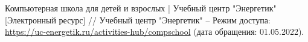 \begin{thebibliography}{00}
        Компьютерная школа для детей и взрослых | Учебный центр "Энергетик"
        [Электронный ресурс]
        //
        Учебный центр "Энергетик"
        --
        Режим доступа:
        \href{https://uc-energetik.ru/activities-hub/compschool}{https://uc-energetik.ru/activities-hub/compschool}
        (дата обращения: 01.05.2022).


\begin{comment}

    \bibitem{livejournal}
        Главное - ЖЖ
        [Электронный ресурс] //
        LiveJournal — сервис для ведения блога и развития сообщества
        --
        Режим доступа:
        \href{https://www.livejournal.com/}{https://www.livejournal.com/}
        
    \bibitem{kickstarter}
        Kickstarter
        [Электронный ресурс] //
        Kickstarter - краудфандинговая платформа.
        --
        Режим доступа:
        \href{https://www.kickstarter.com/}{https://www.kickstarter.com/}

    \bibitem{ozon}
        OZON — интернет-магазин. Миллионы товаров по выгодным ценам
        [Электронный ресурс] //
        OZON. Интернет магазин
        --
        Режим доступа:
        \href{https://www.ozon.ru/}{https://www.ozon.ru/}

    \bibitem{stepik}
        Stepik
        [Электронный ресурс] //
        Stepik - интернет платформа для создания и распространения обучающего контента
        --
        Режим доступа:
        \href{https://stepik.org}{https://stepik.org/}

    \bibitem{vk}
        ВКонтакте
        [Электронный ресурс] //
        ВКонтакте - социальная сеть
        --
        Режим доступа:
        \href{https://vk.com/}{https://vk.com/}

    \bibitem{wiki}
        Википедия
        [Электронный ресурс] //
        Википедия. Свободная энциклопедия
        --
        Режим доступа:
        \href{https://ru.wikipedia.org/}{https://ru.wikipedia.org/}

    \bibitem{wiki-CMS}
        CMS -- Википедия 
        [Электронный ресурс] //
        Википедия. Свободная энциклопедия
        --
        Режим доступа:
        \href{https://ru.wikipedia.org/wiki/CMS}{https://ru.wikipedia.org/wiki/CMS}

    \bibitem{cmsmagazine}
        Движки для сайтов, платные и бесплатные CMS системы, каталог систем управления сайтами
        [Электронный ресурс] //
        CMS Magazine - digital-журнал
        --
        Режим доступа:
        \href{https://cmsmagazine.ru/cms/}{https://cmsmagazine.ru/cms/}


\end{comment}
\end{thebibliography}

